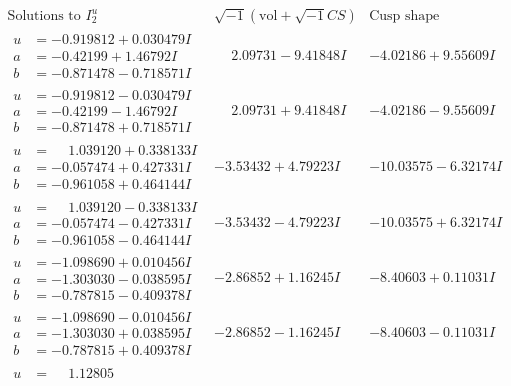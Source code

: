\documentclass[1p]{elsarticle_modified}
\theoremstyle{definition}
\newcommand{\I}{\sqrt{-1}}
\begin{document}
$$\begin{array}{c|c|c}  
\text{Solutions to }I^u_{2}& \I (\text{vol} + \sqrt{-1}CS) & \text{Cusp shape}\\
 \hline 
\begin{aligned}
u &= -0.919812 + 0.030479 I \\
a &= -0.42199 + 1.46792 I \\
b &= -0.871478 - 0.718571 I\end{aligned}
 & \phantom{-}2.09731 - 9.41848 I & -4.02186 + 9.55609 I \\ \hline\begin{aligned}
u &= -0.919812 - 0.030479 I \\
a &= -0.42199 - 1.46792 I \\
b &= -0.871478 + 0.718571 I\end{aligned}
 & \phantom{-}2.09731 + 9.41848 I & -4.02186 - 9.55609 I \\ \hline\begin{aligned}
u &= \phantom{-}1.039120 + 0.338133 I \\
a &= -0.057474 + 0.427331 I \\
b &= -0.961058 + 0.464144 I\end{aligned}
 & -3.53432 + 4.79223 I & -10.03575 - 6.32174 I \\ \hline\begin{aligned}
u &= \phantom{-}1.039120 - 0.338133 I \\
a &= -0.057474 - 0.427331 I \\
b &= -0.961058 - 0.464144 I\end{aligned}
 & -3.53432 - 4.79223 I & -10.03575 + 6.32174 I \\ \hline\begin{aligned}
u &= -1.098690 + 0.010456 I \\
a &= -1.303030 - 0.038595 I \\
b &= -0.787815 - 0.409378 I\end{aligned}
 & -2.86852 + 1.16245 I & -8.40603 + 0.11031 I \\ \hline\begin{aligned}
u &= -1.098690 - 0.010456 I \\
a &= -1.303030 + 0.038595 I \\
b &= -0.787815 + 0.409378 I\end{aligned}
 & -2.86852 - 1.16245 I & -8.40603 - 0.11031 I \\ \hline\begin{aligned}
u &= \phantom{-}1.12805\phantom{ +0.000000I} \\

\end{aligned}
\end{array}$$
\end{document}
